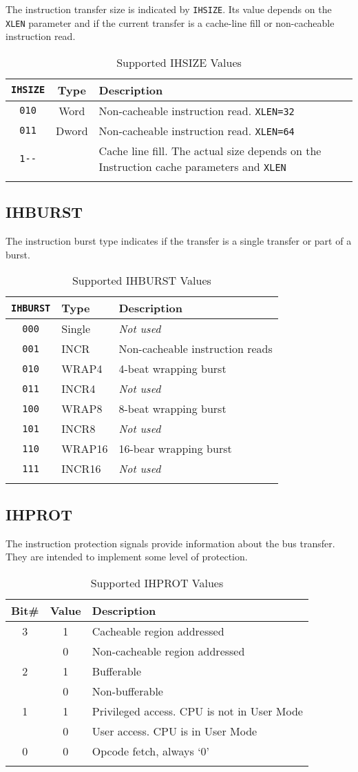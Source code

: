 The instruction transfer size is indicated by \texttt{IHSIZE}. Its value depends
on the \texttt{XLEN} parameter and if the current transfer is a cache-line fill
or non-cacheable instruction read.

\begin{longtable}[]{@{}ccp{7cm}@{}}
	\toprule
	\texttt{IHSIZE} & Type & Description\tabularnewline
	\midrule
	\endhead
	\texttt{010}   & Word  & Non-cacheable instruction read. \texttt{XLEN=32}\tabularnewline
	\texttt{011}   & Dword & Non-cacheable instruction read. \texttt{XLEN=64}\tabularnewline
	\texttt{1-\/-} &       & Cache line fill. The actual size depends on the Instruction cache parameters and \texttt{XLEN}\tabularnewline
	\bottomrule
	\caption{Supported IHSIZE Values}
	\label{tab:isize-values}
\end{longtable}

\subsection{IHBURST}\label{ihburst}

The instruction burst type indicates if the transfer is a single
transfer or part of a burst.

\begin{longtable}[]{@{}cll@{}}
	\toprule
	{\tt IHBURST} & Type & Description\tabularnewline
	\midrule
	\endhead
	\texttt{000} & Single & \emph{Not used}\tabularnewline
	\texttt{001} & INCR   & Non-cacheable instruction reads\tabularnewline
	\texttt{010} & WRAP4  & 4-beat wrapping burst\tabularnewline
	\texttt{011} & INCR4  & \emph{Not used}\tabularnewline
	\texttt{100} & WRAP8  & 8-beat wrapping burst\tabularnewline
	\texttt{101} & INCR8  & \emph{Not used}\tabularnewline
	\texttt{110} & WRAP16 & 16-bear wrapping burst\tabularnewline
	\texttt{111} & INCR16 & \emph{Not used}\tabularnewline
	\bottomrule
	\caption{Supported IHBURST Values}
	\label{tab:ihburst-values}
\end{longtable}

\subsection{IHPROT}\label{ihprot}

The instruction protection signals provide information about the bus
transfer. They are intended to implement some level of protection.

\begin{longtable}[]{@{}ccl@{}}
\toprule
Bit\# & Value & Description\tabularnewline
\midrule
\endhead
3 & 1 & Cacheable region addressed\tabularnewline
  & 0 & Non-cacheable region addressed\tabularnewline
2 & 1 & Bufferable\tabularnewline
  & 0 & Non-bufferable\tabularnewline
1 & 1 & Privileged access. CPU is not in User Mode\tabularnewline
  & 0 & User access. CPU is in User Mode\tabularnewline
0 & 0 & Opcode fetch, always `0'\tabularnewline
\bottomrule
\caption{Supported IHPROT Values}
\label{tab:ihprot-values}
\end{longtable}


